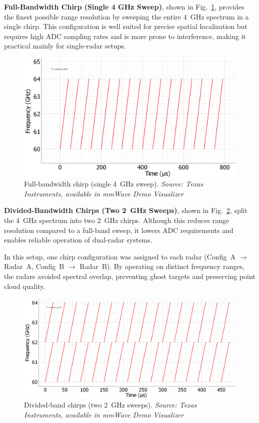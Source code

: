 \textbf{Full-Bandwidth Chirp (Single 4 GHz Sweep)}, shown in Fig.~\ref{fig:profile4GHz}, provides the finest possible range resolution by sweeping the entire 4~GHz spectrum in a single chirp.  
This configuration is well suited for precise spatial localization but requires high ADC sampling rates and is more prone to interference, making it practical mainly for single-radar setups.  

\begin{figure}[!htbp]
    \centering
    \includegraphics[width=0.7\linewidth]{images/profile_full_4GHz.png}
    \caption{Full-bandwidth chirp (single 4~GHz sweep).  
    \textit{Source: Texas Instruments, available in mmWave Demo Visualizer \cite{mmwave_demo_doc}}}
    \label{fig:profile4GHz}
\end{figure}

\textbf{Divided-Bandwidth Chirps (Two 2~GHz Sweeps)}, shown in Fig.~\ref{fig:profile2GHz}, split the 4~GHz spectrum into two 2~GHz chirps.  
Although this reduces range resolution compared to a full-band sweep, it lowers ADC requirements and enables reliable operation of dual-radar systems.  

In this setup, one chirp configuration was assigned to each radar (Config~A $\rightarrow$ Radar~A, Config~B $\rightarrow$ Radar~B).  
By operating on distinct frequency ranges, the radars avoided spectral overlap, preventing ghost targets and preserving point cloud quality.  

\begin{figure}[!htbp]
    \centering
    \includegraphics[width=0.7\linewidth]{images/profile_two_2GHz.png}
    \caption{Divided-band chirps (two 2~GHz sweeps).  
    \textit{Source: Texas Instruments, available in mmWave Demo Visualizer \cite{mmwave_demo_doc}}}
    \label{fig:profile2GHz}
\end{figure}

